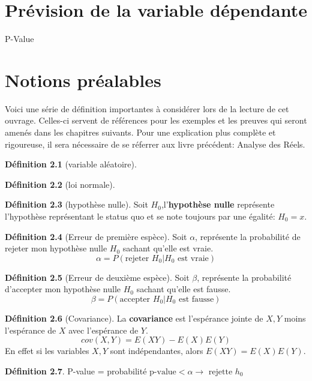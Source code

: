 \documentclass[12pt]{book}
\newcommand\todo[1]{\phantom{#1}}
\theoremstyle{definition}
\newtheorem{definition}{Définition}[section]
\begin{document}
\chapter{Prévision de la variable dépendante}
P-Value
\appendix
\chapter{Notions préalables}
Voici une série de définition importantes à considérer lors de la lecture de cet ouvrage. Celles-ci servent
de références pour les exemples et les preuves qui seront amenés dans les chapitres suivants. Pour une explication
plus complète et rigoureuse, il sera nécessaire de se réferrer aux livre précédent: Analyse des Réels.
\begin{definition}[variable aléatoire]
    \label{def:variable_aleatoire}
\end{definition}

\begin{definition}[loi normale]
    \label{def:loi_normale}
    
\end{definition}

\begin{definition}[hypothèse nulle]
    \label{def:hypothese_nulle}
    Soit $H_0$,l'\textbf{hypothèse nulle} représente l'hypothèse représentant le status quo et 
    se note toujours par une égalité: $H_0 = x$.
\end{definition}

\begin{definition}[Erreur de première espèce]
    \label{def:erreur_alpha}
    Soit $\alpha$, représente la probabilité de rejeter mon hypothèse nulle $H_0$ \todo{Add link} sachant
    qu'elle est vraie.
    $$\alpha = P(\text{rejeter }H_0 | H_0\text{ est vraie})$$
\end{definition}

\begin{definition}[Erreur de deuxième espèce]
    \label{def:erreur_beta}
    Soit $\beta$, représente la probabilité d'accepter mon hypothèse nulle $H_0$ \todo{Add link} sachant
    qu'elle est fausse.
    $$\beta = P(\text{accepter }H_0 | H_0\text{ est fausse})$$
\end{definition}

\begin{definition}[Covariance]
    La \textbf{covariance} est l'espérance jointe de $X,Y$ moins l'espérance de $X$ avec l'espérance de $Y$.
    $$ cov(X, Y) = E(XY) - E(X)E(Y) $$
    En effet si les variables $X,Y$ sont indépendantes, alors $E(XY) = E(X)E(Y)$.
\end{definition}

\begin{definition}
    P-value =  probabilité
    $\text{p-value} < \alpha \to \text{ rejette } h_0$
\end{definition}
\end{document}
